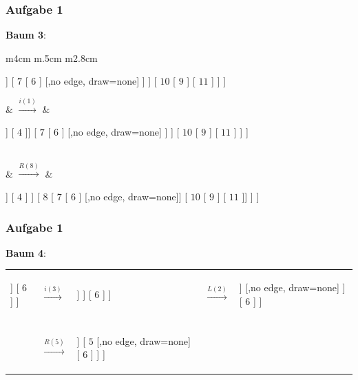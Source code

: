 \documentclass{beamer}
\begin{document}
\begin{frame} \frametitle{Aufgabe 1}
	\textbf{Baum 3}:
	\footnotesize
	\begin{tabularx}{\linewidth}{m{4cm} m{.5cm} m{2.8cm}}
		\begin{forest}
			[ $8$ [ $5$ [ $3$ [ $2$ ] [ $4$ ]] [ $7$ [ $6$ ] [,no edge, draw=none]  ] ] [ $10$ [ $9$ ] [ $11$ ] ] ]
		\end{forest}
		&
		$\overset{i(1)}{\longrightarrow}$
		&
		\begin{forest}
			[ $8^{-2}$ [ $5^{-1}$ [ $3^{-1}$ [ $2^{-1}$ [ $1^0$ ] [,no edge, draw=none]] [ $4$ ]] [ $7$ [ $6$ ] [,no edge, draw=none]  ] ] [ $10$ [ $9$ ] [ $11$ ] ] ]
		\end{forest} 
		\\
		&
		$\overset{R(8)}{\longrightarrow}$
		&
		\begin{forest}
			[ $5$ [ $3$ [ $2$ [ $1$ ] [,no edge, draw=none] ] [ $4$ ] ] [ $8$ [ $7$ [ $6$ ] [,no edge, draw=none]] [ $10$ [ $9$ ] [ $11$ ]] ] ]
		\end{forest} 
	\end{tabularx}
\end{frame}

\begin{frame} \frametitle{Aufgabe 1}
	\textbf{Baum 4}:
	\small
	\begin{tabularx}{\linewidth}{m{2cm} m{.5cm} m{2.5cm} m{.5cm} m{2cm}}
		\begin{forest}
			[ $5$ [ $2$ [ $1$ ] [ $4$ ] ] [ $6$ ] ]
		\end{forest} 
		&
		$\overset{i(3)}{\longrightarrow}$
		&
		\begin{forest}
			[ $5^{-2}$ [ $2^{1}$ [ $1$ ] [ $4^{-1}$ [ $3^0$ ] [,no edge, draw=none]] ] [ $6$ ] ]
		\end{forest} 
		&
		$\overset{L(2)}{\longrightarrow}$
		&
		\begin{forest}
			[ $5$ [ $4$ [ $2$ [ $1$ ] [ $3$ ] ] [,no edge, draw=none] ] [ $6$ ] ]
		\end{forest}  \\ \\
		& $\overset{R(5)}{\longrightarrow}$
		& 
		\begin{forest}
			[ $4$ [ $2$ [ $1$ ] [ $3$ ]] [ $5$ [,no edge, draw=none] [ $6$ ] ] ]
		\end{forest}
	\end{tabularx}
\end{frame}
\end{document}
